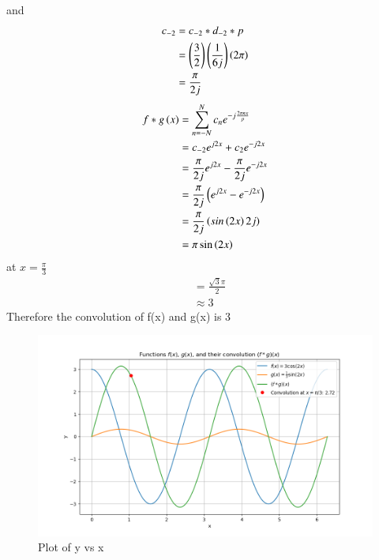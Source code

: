 \documentclass[journal,12pt,twocolumn]{IEEEtran}
\theoremstyle{remark}
\begin{document}
and
\begin{align}
    c_{-2}&=c_{-2}*d_{-2}*p\\
    &=\left(\frac{3}{2}\right)\left(\frac{1}{6j}\right)\left(2\pi\right)\\
    &=\frac{\pi}{2j}
\end{align}
\begin{align}
   {f*g}\left(x\right)&=\sum_{n=-N}^{N}c_{n} e^{-j\frac{2\pi nx}{p}}\\
    &=c_{-2}e^{j2x} + c_{2}e^{-j2x}\\
    &=\frac{\pi}{2j}e^{j2x}-\frac{\pi}{2j}e^{-j2x}\\
    &=\frac{\pi}{2j}\left(e^{j2x}-e^{-j2x}\right)\\
    &=\frac{\pi}{2j}\left(sin\left(2x\right)2j\right)\\
    &=\pi \sin\left(2x\right)\\
\end{align}
at $x=\frac{\pi}{3}$
\begin{align}
    &=\frac{\sqrt{3}\pi}{2}\\
    &\approx 3
\end{align}
Therefore the convolution of f(x) and g(x) is 3
\begin{figure}[!h]
    \centering
    \includegraphics[width=1.0\linewidth]{2023/GE/81/figs/ga.81.png}
    \caption{Plot of y vs x}
    \label{fig:1}
\end{figure}
\end{document}
